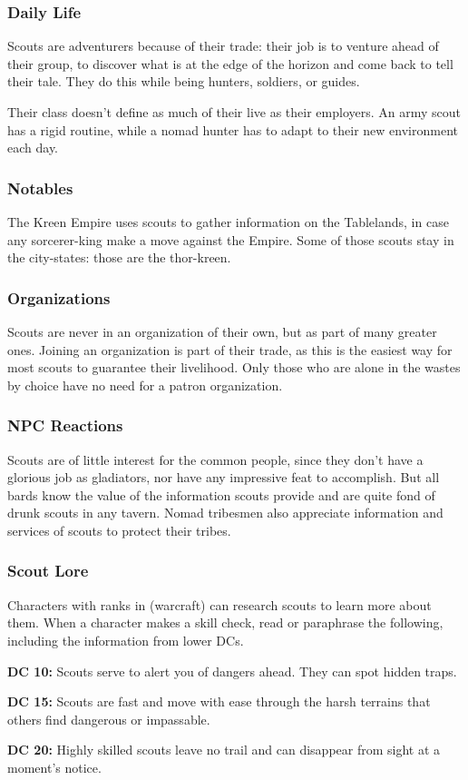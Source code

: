 \subsubsection{Daily Life}
Scouts are adventurers because of their trade: their job is to venture ahead of their group, to discover what is at the edge of the horizon and come back to tell their tale. They do this while being hunters, soldiers, or guides.

Their class doesn't define as much of their live as their employers. An army scout has a rigid routine, while a nomad hunter has to adapt to their new environment each day.

\subsubsection{Notables}
The Kreen Empire uses scouts to gather information on the Tablelands, in case any sorcerer-king make a move against the Empire. Some of those scouts stay in the city-states: those are the thor-kreen.

\subsubsection{Organizations}
Scouts are never in an organization of their own, but as part of many greater ones. Joining an organization is part of their trade, as this is the easiest way for most scouts to guarantee their livelihood. Only those who are alone in the wastes by choice have no need for a patron organization.

\subsubsection{NPC Reactions}
Scouts are of little interest for the common people, since they don't have a glorious job as gladiators, nor have any impressive feat to accomplish. But all bards know the value of the information scouts provide and are quite fond of drunk scouts in any tavern. Nomad tribesmen also appreciate information and services of scouts to protect their tribes.

\subsubsection{Scout Lore}
Characters with ranks in  (warcraft) can research scouts to learn more about them. When a character makes a skill check, read or paraphrase the following, including the information from lower DCs.

\textbf{DC 10:} Scouts serve to alert you of dangers ahead. They can spot hidden traps.

\textbf{DC 15:} Scouts are fast and move with ease through the harsh terrains that others find dangerous or impassable.

\textbf{DC 20:} Highly skilled scouts leave no trail and can disappear from sight at a moment's notice.
